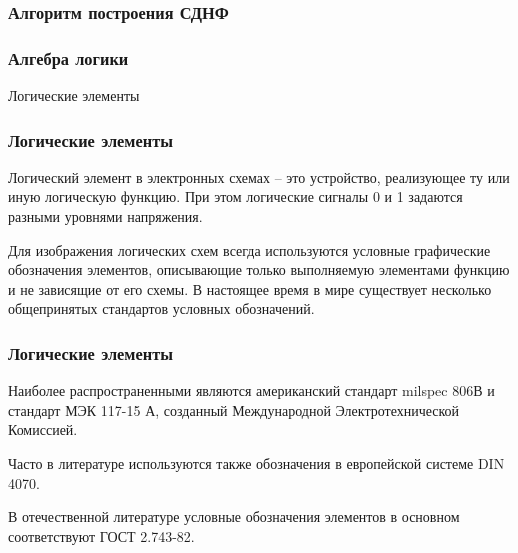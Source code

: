 \begin{frame}
\frametitle{Алгоритм построения СДНФ}






\end{frame}


\begin{frame}
\frametitle{Алгебра логики}

\begin{center}

\Huge
Логические элементы	
\end{center}


\end{frame}

\begin{frame}
\frametitle{Логические элементы	}

Логический элемент в электронных схемах – это устройство, реализующее ту или
иную логическую функцию. При этом логические сигналы 0 и 1 задаются разными
уровнями напряжения.

Для изображения логических схем всегда используются условные графические
обозначения элементов, описывающие только выполняемую элементами функцию и не
зависящие от его схемы. В настоящее время в мире существует несколько общепринятых
стандартов условных обозначений. 



\end{frame}

\begin{frame}
\frametitle{Логические элементы	}

Наиболее распространенными являются
американский стандарт milspec 806В и стандарт МЭК 117-15 А, созданный
Международной Электротехнической Комиссией. 

Часто в литературе используются
также обозначения в европейской системе DIN 4070. 

В отечественной литературе
условные обозначения элементов в основном соответствуют ГОСТ 2.743-82.


\end{frame}

